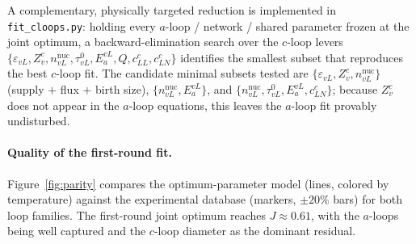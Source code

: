 \documentclass{article}
\begin{document}
A complementary, physically targeted reduction is implemented in
\texttt{fit\_cloops.py}: holding every $a$-loop / network / shared parameter
frozen at the joint optimum, a backward-elimination search over the $c$-loop
levers $\{\varepsilon_{vL},Z_v^c,n_{vL}^{\mathrm{nuc}},\tau^0_{vL},E^{vL}_a,Q,
c_{LL}^c,c_{LN}^c\}$ identifies the smallest subset that reproduces the best
$c$-loop fit. The candidate minimal subsets tested are
$\{\varepsilon_{vL},Z_v^c,n_{vL}^{\mathrm{nuc}}\}$ (supply $+$ flux $+$ birth
size), $\{n_{vL}^{\mathrm{nuc}},E^{vL}_a\}$, and
$\{n_{vL}^{\mathrm{nuc}},\tau^0_{vL},E^{vL}_a,c_{LN}^c\}$; because $Z_v^c$ does
not appear in the $a$-loop equations, this leaves the $a$-loop fit provably
undisturbed.

\paragraph{Quality of the first-round fit.}
Figure~\ref{fig:parity} compares the optimum-parameter model (lines, colored by
temperature) against the experimental database (markers, $\pm20\%$ bars) for both
loop families. The first-round joint optimum reaches $J\approx0.61$, with the
$a$-loops being well captured and the $c$-loop diameter as the dominant residual.
\end{document}
